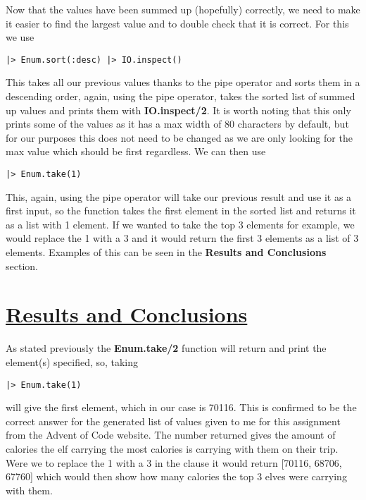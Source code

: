 \documentclass[a4paper,11pt]{article}
\begin{document}
Now that the values have been summed up (hopefully) correctly, we need to make it easier to find the largest value and to double check that it is correct. For this we use \begin{verbatim} 
|> Enum.sort(:desc) |> IO.inspect() 
\end{verbatim}
This takes all our previous values thanks to the pipe operator and sorts them in a descending order, again, using the pipe operator, takes the sorted list of summed up values and prints them with \textbf{IO.inspect/2}. It is worth noting that this only prints some of the values as it has a max width of 80 characters by default, but for our purposes this does not need to be changed as we are only looking for the max value which should be first regardless. We can then use 
\begin{verbatim}
|> Enum.take(1)
\end{verbatim}
This, again, using the pipe operator will take our previous result and use it as a first input, so the function takes the first element in the sorted list and returns it as a list with 1 element. If we wanted to take the top 3 elements for example, we would replace the 1 with a 3 and it would return the first 3 elements as a list of 3 elements. Examples of this can be seen in the \textbf{Results and Conclusions} section.
	
\section*{
	\underline{Results and Conclusions}
}
As stated previously the \textbf{Enum.take/2} function will return and print the element(s) specified, so, taking 
\begin{verbatim}
|> Enum.take(1)
\end{verbatim}
 will give the first element, which in our case is 70116. This is confirmed to be the correct answer for the generated list of values given to me for this assignment from the Advent of Code website. The number returned gives the amount of calories the elf carrying the most calories is carrying with them on their trip. Were we to replace the 1 with a 3 in the clause it would return [70116, 68706, 67760] which would then show how many calories the top 3 elves were carrying with them.
\end{document}
